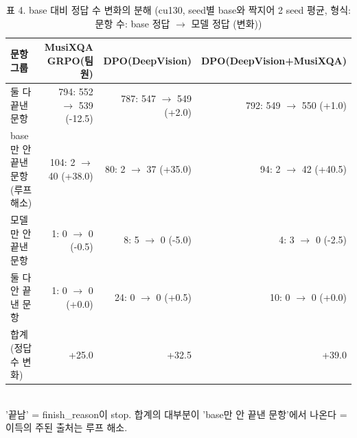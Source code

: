 \begin{table}[t]
\centering
\small
\caption{표 4. base 대비 정답 수 변화의 분해 (cu130, seed별 base와 짝지어 2 seed 평균, 형식: 문항 수: base 정답 $\to$ 모델 정답 (변화))}
\label{tab:table4_decomposition}
\begin{tabular}{lrrr}
\toprule
문항 그룹 & MusiXQA GRPO(팀원) & DPO(DeepVision) & DPO(DeepVision+MusiXQA) \\
\midrule
둘 다 끝낸 문항 & 794: 552 $\to$ 539 (-12.5) & 787: 547 $\to$ 549 (+2.0) & 792: 549 $\to$ 550 (+1.0) \\
base만 안 끝낸 문항(루프 해소) & 104: 2 $\to$ 40 (+38.0) & 80: 2 $\to$ 37 (+35.0) & 94: 2 $\to$ 42 (+40.5) \\
모델만 안 끝낸 문항 & 1: 0 $\to$ 0 (-0.5) & 8: 5 $\to$ 0 (-5.0) & 4: 3 $\to$ 0 (-2.5) \\
둘 다 안 끝낸 문항 & 1: 0 $\to$ 0 (+0.0) & 24: 0 $\to$ 0 (+0.5) & 10: 0 $\to$ 0 (+0.0) \\
합계(정답 수 변화) & +25.0 & +32.5 & +39.0 \\
\bottomrule
\end{tabular}
\\[2pt]{\footnotesize '끝남' = finish\_reason이 stop. 합계의 대부분이 'base만 안 끝낸 문항'에서 나온다 = 이득의 주된 출처는 루프 해소.}
\end{table}
